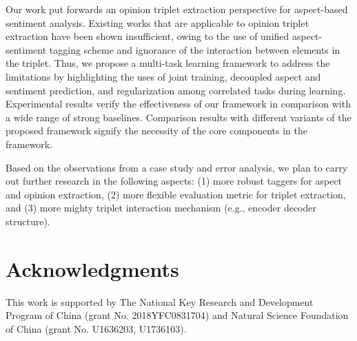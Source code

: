 \documentclass[11pt,a4paper]{article}
\begin{document}
Our work put forwards an opinion triplet extraction perspective for aspect-based sentiment analysis. Existing works that are applicable to opinion triplet extraction have been shown insufficient, owing to the use of unified aspect-sentiment tagging scheme and ignorance of the interaction between elements in the triplet. Thus, we propose a multi-task learning framework to address the limitations by highlighting the uses of joint training, decoupled aspect and sentiment prediction, and regularization among correlated tasks during learning. Experimental results verify the effectiveness of our framework in comparison with a wide range of strong baselines. Comparison results with different variants of the proposed framework signify the necessity of the core components in the framework.

Based on the observations from a case study and error analysis, we plan to carry out further research in the following aspects: (1) more robust taggers for aspect and opinion extraction, (2) more flexible evaluation metric for triplet extraction, and (3) more mighty triplet interaction mechanism (e.g., encoder decoder structure).  
\section*{Acknowledgments}

This work is supported by The National Key Research and Development Program of China (grant No. 2018YFC0831704) and Natural Science Foundation of China (grant No. U1636203, U1736103).



\end{document}
